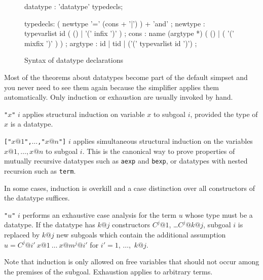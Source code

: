 \begin{figure}
\begin{rail}
datatype : 'datatype' typedecls;

typedecls: ( newtype '=' (cons + '|') ) + 'and'
         ;
newtype  : typevarlist id ( () | '(' infix ')' )
         ;
cons     : name (argtype *) ( () | ( '(' mixfix ')' ) )
         ;
argtype  : id | tid | ('(' typevarlist id ')')
         ;
\end{rail}
\caption{Syntax of datatype declarations}
\label{datatype-grammar}
\end{figure}

Most of the theorems about datatypes become part of the default simpset and
you never need to see them again because the simplifier applies them
automatically.  Only induction or exhaustion are usually invoked by hand.
\begin{ttdescription}
\item[\ttindexbold{induct_tac} {\tt"}$x${\tt"} $i$]
 applies structural induction on variable $x$ to subgoal $i$, provided the
 type of $x$ is a datatype.
\item[\ttindexbold{mutual_induct_tac}
  {\tt["}$x@1${\tt",}$\ldots${\tt,"}$x@n${\tt"]} $i$] applies simultaneous
  structural induction on the variables $x@1,\ldots,x@n$ to subgoal $i$.  This
  is the canonical way to prove properties of mutually recursive datatypes
  such as {\tt aexp} and {\tt bexp}, or datatypes with nested recursion such as
  {\tt term}.
\end{ttdescription}
In some cases, induction is overkill and a case distinction over all
constructors of the datatype suffices.
\begin{ttdescription}
\item[\ttindexbold{exhaust_tac} {\tt"}$u${\tt"} $i$]
 performs an exhaustive case analysis for the term $u$ whose type
 must be a datatype.  If the datatype has $k@j$ constructors
 $C^j@1$, \dots $C^j@{k@j}$, subgoal $i$ is replaced by $k@j$ new subgoals which
 contain the additional assumption $u = C^j@{i'}~x@1~\dots~x@{m^j@{i'}}$ for
 $i'=1$, $\dots$,~$k@j$.
\end{ttdescription}

Note that induction is only allowed on free variables that should not occur
among the premises of the subgoal.  Exhaustion applies to arbitrary terms.

\bigskip


